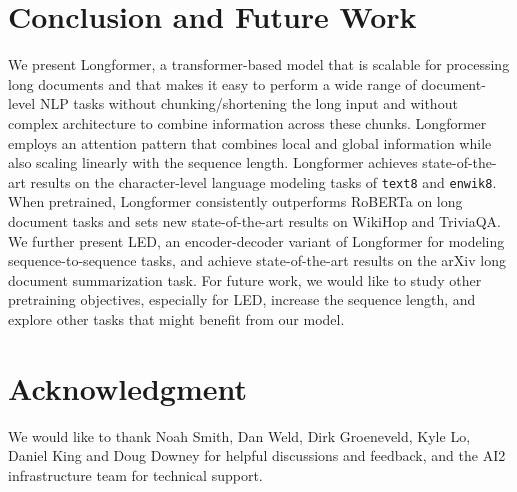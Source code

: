 \documentclass[11pt,a4paper]{article}
\newcommand{\model}{Longformer\xspace}
\newcommand{\ib}[1]{\textcolor{teal}{[#1 ({\bf IB})]}}
\newcommand{\ac}[1]{\textcolor{purple}{[#1 ({\bf AC})]}}
\newcommand{\matt}[1]{\textcolor{brown}{[#1 ({\bf MP})]}}
\begin{document}







% 

\section{Conclusion and Future Work}
We present \model, a transformer-based model that is scalable for processing long documents and that makes it easy to perform a wide 
range of document-level NLP tasks without chunking/shortening the long input and without complex architecture to combine information across these chunks. 
\model employs an attention pattern that combines local and global
information while also scaling linearly with the sequence length.
\model achieves state-of-the-art results on the character-level
language modeling tasks of \texttt{text8} and \texttt{enwik8}. 
When pretrained, 
\model consistently outperforms RoBERTa on long document tasks and
sets new state-of-the-art results on WikiHop and TriviaQA. 
We further present LED, an encoder-decoder variant of Longformer for modeling sequence-to-sequence tasks, and achieve state-of-the-art results on the arXiv long document summarization task. 
For future work, we would like to study other pretraining objectives, especially for LED, increase the sequence length, and explore other tasks that might benefit from our model. 


\section*{Acknowledgment}
We would like to thank Noah Smith, Dan Weld, Dirk Groeneveld, Kyle Lo, Daniel King and Doug Downey for helpful discussions and feedback, and the AI2 infrastructure team for technical support. 



\clearpage

\appendix

\end{document}

